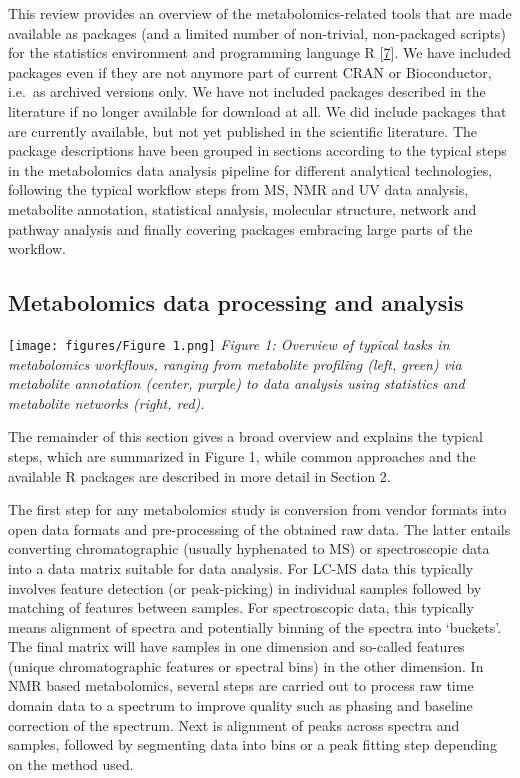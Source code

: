 \documentclass[]{article}
\begin{document}
This review provides an overview of the metabolomics-related tools that are made available as packages (and a limited number of non-trivial, non-packaged scripts) for the statistics environment and programming language R {[}\protect\hyperlink{ref-rcoredevelopmentteam_website_2018}{7}{]}. We have included packages even if they are not anymore part of current CRAN or Bioconductor, i.e.~as archived versions only. We have not included packages described in the literature if no longer available for download at all. We did include packages that are currently available, but not yet published in the scientific literature. The package descriptions have been grouped in sections according to the typical steps in the metabolomics data analysis pipeline for different analytical technologies, following the typical workflow steps from MS, NMR and UV data analysis, metabolite annotation, statistical analysis, molecular structure, network and pathway analysis and finally covering packages embracing large parts of the workflow.

\newpage

\hypertarget{metabolomics-data-processing-and-analysis}{%
\subsection{Metabolomics data processing and analysis}\label{metabolomics-data-processing-and-analysis}}

\texttt{[image: figures/Figure 1.png]}
\emph{Figure 1: Overview of typical tasks in metabolomics workflows, ranging from metabolite profiling (left, green) via metabolite annotation (center, purple) to data analysis using statistics and metabolite networks (right, red).}

The remainder of this section gives a broad overview and explains the typical steps, which are summarized in Figure 1, while common approaches and the available R packages are described in more detail in Section 2.

The first step for any metabolomics study is conversion from vendor formats into open data formats and pre-processing of the obtained raw data. The latter entails converting chromatographic (usually hyphenated to MS) or spectroscopic data into a data matrix suitable for data analysis. For LC-MS data this typically involves feature detection (or peak-picking) in individual samples followed by matching of features between samples. For spectroscopic data, this typically means alignment of spectra and potentially binning of the spectra into `buckets'. The final matrix will have samples in one dimension and so-called features (unique chromatographic features or spectral bins) in the other dimension. In NMR based metabolomics, several steps are carried out to process raw time domain data to a spectrum to improve quality such as phasing and baseline correction of the spectrum. Next is alignment of peaks across spectra and samples, followed by segmenting data into bins or a peak fitting step depending on the method used.
\end{document}
